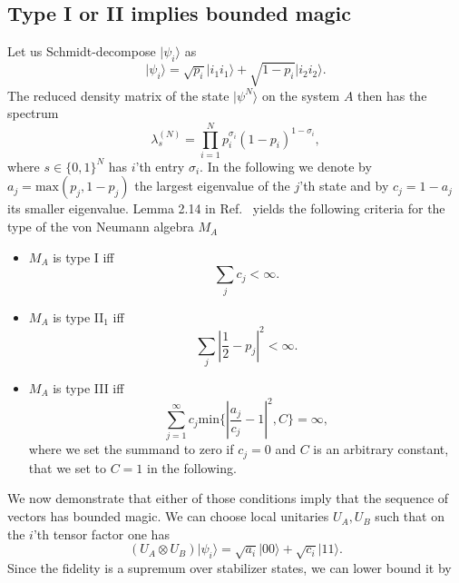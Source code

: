 \documentclass[aps,pra,reprint,superscriptaddress]{revtex4-2}
\renewcommand\l{\lambda}
\newcommand\s{\sigma}
\providecommand{\ket}[1]{\lvert #1\rangle}
\theoremstyle{definition}
\theoremstyle{remark}
\begin{document}
\subsection{Type I or II implies bounded magic}
    Let us Schmidt-decompose $\ket{\psi_i}$ as
    \begin{equation}
        \ket{\psi_i} = \sqrt{p_i} \ket{i_1 i_1} + \sqrt{1-p_i} \ket{i_2 i_2}.
    \end{equation}
    The reduced density matrix of the state $\ket{\psi^N}$ on the system $A$ then has the spectrum
    \begin{equation}\label{eq:finite_spectrum}
        \l^{(N)}_s = \prod_{i=1}^{N}p_i^{\s_i} (1-p_i)^{1-\s_i},
    \end{equation}
    where $s \in \{0,1 \}^N$ has $i$'th entry $\s_i$. In the following we denote by $a_j = \mathrm{max}(p_j,1-p_j)$ the largest eigenvalue of the $j$'th state and by $c_j = 1-a_j$ its smaller eigenvalue.
    Lemma 2.14 in Ref.~\cite{ArakiWoods1968} yields the following criteria for the type of the von Neumann algebra $M_A$
   \begin{itemize}
       \item[1)] $M_A$ is type I iff
           \begin{equation}
               \sum_j c_j < \infty. \label{eq:type-1}
           \end{equation}
       \item[2)] $M_A$ is type II$_1$ iff
           \begin{equation}
               \sum_j |\frac{1}{2}-p_j|^2 < \infty. \label{eq:type-2}
           \end{equation}
        \item[3)] $M_A$ is type III iff
    \begin{equation}
        \sum_{j=1}^{\infty} c_j \mathrm{min}\{|\frac{a_j}{c_j}-1|^2, C\} = \infty, \label{eq:type-3}
    \end{equation}
    where we set the summand to zero if $c_j =0$ and $C$ is an arbitrary constant,
that we set to $C = 1$ in the following. 
   \end{itemize}
   We now demonstrate that either of those conditions imply that the sequence
   of vectors has bounded magic.
We can choose local unitaries $U_A,U_B$ such that on the $i$'th tensor factor one has
\begin{equation}
    (U_A\otimes U_B) \ket{\psi_i} = \sqrt{a_i} \ket{00} + \sqrt{c_i} \ket{11}.
\end{equation}
Since the fidelity is a supremum over stabilizer states, we can lower bound it by
\end{document}
